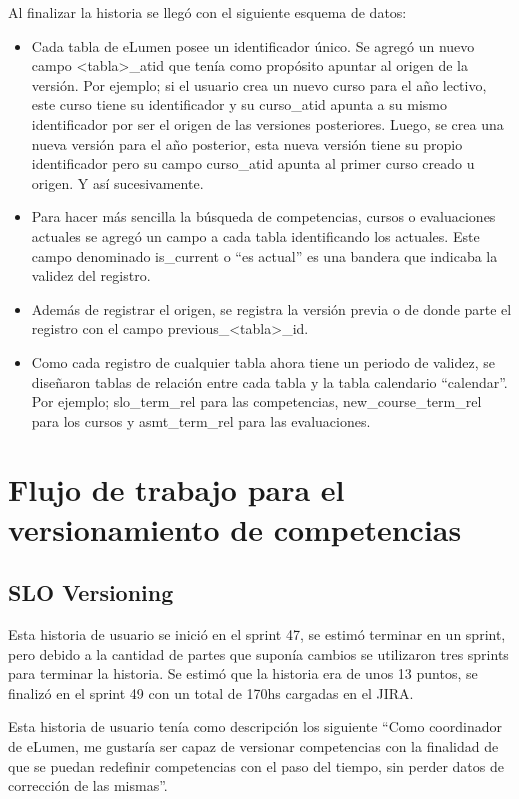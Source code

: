 Al finalizar la historia se llegó con el siguiente esquema de datos:
\begin{itemize}
	\item Cada tabla de eLumen posee un identificador único. Se agregó un nuevo campo <tabla>_atid que tenía como propósito apuntar al origen de la versión. Por ejemplo; si el usuario crea un nuevo curso para el año lectivo, este curso tiene su identificador y su curso_atid apunta a su mismo identificador por ser el origen de las versiones posteriores. Luego, se crea una nueva versión para el año posterior, esta nueva versión tiene su propio identificador pero su campo curso_atid apunta al primer curso creado u origen. Y así sucesivamente.
	\item Para hacer más sencilla la búsqueda de competencias, cursos o evaluaciones actuales se agregó un campo a cada tabla identificando los actuales. Este campo denominado is_current o “es actual” es una bandera que indicaba la validez del registro.
	\item Además de registrar el origen, se registra la versión previa o de donde parte el registro con el campo previous_<tabla>_id.
	\item Como cada registro de cualquier tabla ahora tiene un periodo de validez, se diseñaron tablas de relación entre cada tabla y la tabla calendario “calendar”. Por ejemplo; slo_term_rel para las competencias, new_course_term_rel para los cursos y asmt_term_rel para las evaluaciones.
\end{itemize}

\section{Flujo de trabajo para el versionamiento de competencias}

\subsection{SLO Versioning}
Esta historia de usuario se inició en el sprint 47, se estimó terminar en un sprint, pero debido a la cantidad de partes que suponía cambios se utilizaron tres sprints para terminar la historia. Se estimó que la historia era de unos 13 puntos, se finalizó en el sprint 49 con un total de 170hs cargadas en el JIRA.

Esta historia de usuario tenía como descripción los siguiente “Como coordinador de eLumen, me gustaría ser capaz de versionar competencias con la finalidad de que se puedan redefinir competencias con el paso del tiempo, sin perder datos de corrección de las mismas”.

